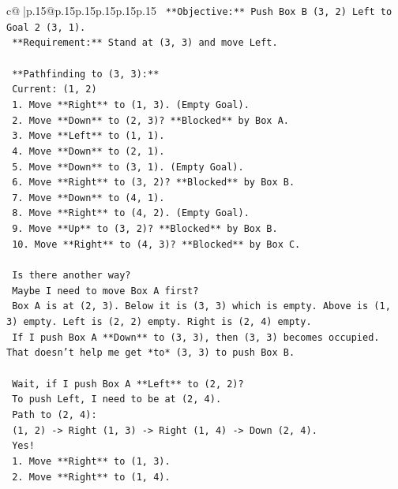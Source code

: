 \documentclass{article}
\begin{document}
{\begin{supertabular}{c@{$\;$}|p{.15\linewidth}@{}p{.15\linewidth}p{.15\linewidth}p{.15\linewidth}p{.15\linewidth}p{.15\linewidth}}
{{{\texttt{    **Objective:** Push Box B (3, 2) Left to Goal 2 (3, 1).} \\
\texttt{    **Requirement:** Stand at (3, 3) and move Left.} \\
\\ 
\texttt{    **Pathfinding to (3, 3):**} \\
\texttt{    Current: (1, 2)} \\
\texttt{    1.  Move **Right** to (1, 3). (Empty Goal).} \\
\texttt{    2.  Move **Down** to (2, 3)? **Blocked** by Box A.} \\
\texttt{    3.  Move **Left** to (1, 1).} \\
\texttt{    4.  Move **Down** to (2, 1).} \\
\texttt{    5.  Move **Down** to (3, 1). (Empty Goal).} \\
\texttt{    6.  Move **Right** to (3, 2)? **Blocked** by Box B.} \\
\texttt{    7.  Move **Down** to (4, 1).} \\
\texttt{    8.  Move **Right** to (4, 2). (Empty Goal).} \\
\texttt{    9.  Move **Up** to (3, 2)? **Blocked** by Box B.} \\
\texttt{    10. Move **Right** to (4, 3)? **Blocked** by Box C.} \\
\\ 
\texttt{    Is there another way?} \\
\texttt{    Maybe I need to move Box A first?} \\
\texttt{    Box A is at (2, 3). Below it is (3, 3) which is empty. Above is (1, 3) empty. Left is (2, 2) empty. Right is (2, 4) empty.} \\
\texttt{    If I push Box A **Down** to (3, 3), then (3, 3) becomes occupied. That doesn't help me get *to* (3, 3) to push Box B.} \\
\\ 
\texttt{    Wait, if I push Box A **Left** to (2, 2)?} \\
\texttt{    To push Left, I need to be at (2, 4).} \\
\texttt{    Path to (2, 4):} \\
\texttt{    (1, 2) {-}> Right (1, 3) {-}> Right (1, 4) {-}> Down (2, 4).} \\
\texttt{    Yes!} \\
\texttt{    1.  Move **Right** to (1, 3).} \\
\texttt{    2.  Move **Right** to (1, 4).} \\
}}}
\end{supertabular}}
\end{document}
